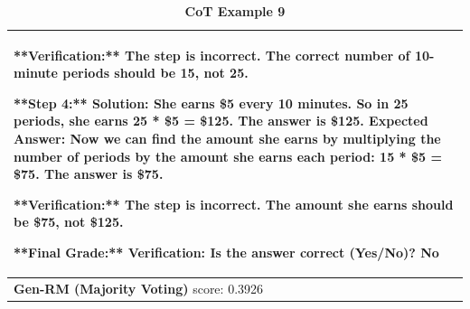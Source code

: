 \begin{table}[ht]
\begin{tabular}{ |p{16.4cm}| }
{**Verification:** {\color{blue}The step is incorrect. The correct number of 10-minute periods should be 15, not 25.}\newline

**Step 4:**\newline
Solution: She earns \$5 every 10 minutes. So in 25 periods, she earns 25 * \$5 = \$125. The answer is \$125.\newline
Expected Answer: Now we can find the amount she earns by multiplying the number of periods by the amount she earns each period: 15 * \$5 = \$75. The answer is \$75.\newline

**Verification:** The step is incorrect. The amount she earns should be \$75, not \$125.\newline

**Final Grade:**\newline
Verification: {\color{blue}Is the answer correct (Yes/No)? No}
\newline
} \\
\midrule
{\textbf{Gen-RM (Majority Voting)} score: {\color{blue}0.3926}}
\newline \\
\midrule
\end{tabular}
\caption{
\textbf{{\genV} CoT Example 9}}
\label{cot-verifier-example-8-full-text}
\end{table}


